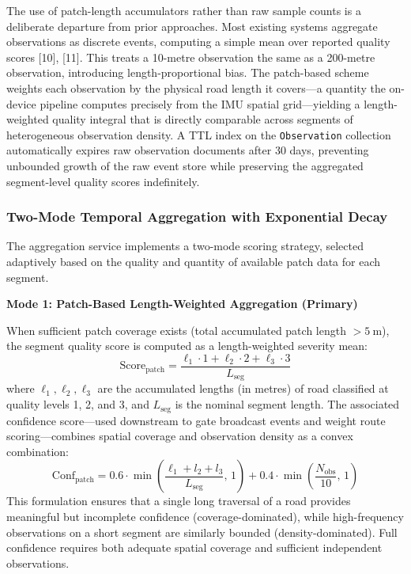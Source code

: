 \documentclass[conference]{IEEEtran}
\begin{document}
The use of patch-length accumulators rather than raw sample counts is a deliberate departure from prior approaches.
Most existing systems aggregate observations as discrete events, computing a simple mean over reported quality scores [10], [11].
This treats a 10-metre observation the same as a 200-metre observation, introducing length-proportional bias.
The patch-based scheme weights each observation by the physical road length it covers---a quantity the on-device pipeline computes precisely from the IMU spatial grid---yielding a length-weighted quality integral that is directly comparable across segments of heterogeneous observation density.
A TTL index on the \texttt{Observation} collection automatically expires raw observation documents after 30 days, preventing unbounded growth of the raw event store while preserving the aggregated segment-level quality scores indefinitely.

\subsubsection{Two-Mode Temporal Aggregation with Exponential Decay}
The aggregation service implements a two-mode scoring strategy, selected adaptively based on the quality and quantity of available patch data for each segment.

\textbf{Mode 1: Patch-Based Length-Weighted Aggregation (Primary)}

When sufficient patch coverage exists (total accumulated patch length $> 5~\text{m}$), the segment quality score is computed as a length-weighted severity mean:
\begin{equation}
\text{Score}_{\text{patch}} = \frac{\ell_1 \cdot 1 + \ell_2 \cdot 2 + \ell_3 \cdot 3}{L_{\text{seg}}}
\end{equation}
where $\ell_1, \ell_2, \ell_3$ are the accumulated lengths (in metres) of road classified at quality levels 1, 2, and 3, and $L_{\text{seg}}$ is the nominal segment length.
The associated confidence score---used downstream to gate broadcast events and weight route scoring---combines spatial coverage and observation density as a convex combination:
\begin{equation}
\text{Conf}_{\text{patch}} = 0.6 \cdot \min\!\left(\frac{\ell_1+l_2+l_3}{L_{\text{seg}}},\, 1\right) + 0.4 \cdot \min\!\left(\frac{N_{\text{obs}}}{10},\, 1\right)
\end{equation}
This formulation ensures that a single long traversal of a road provides meaningful but incomplete confidence (coverage-dominated), while high-frequency observations on a short segment are similarly bounded (density-dominated).
Full confidence requires both adequate spatial coverage and sufficient independent observations.
\end{document}
